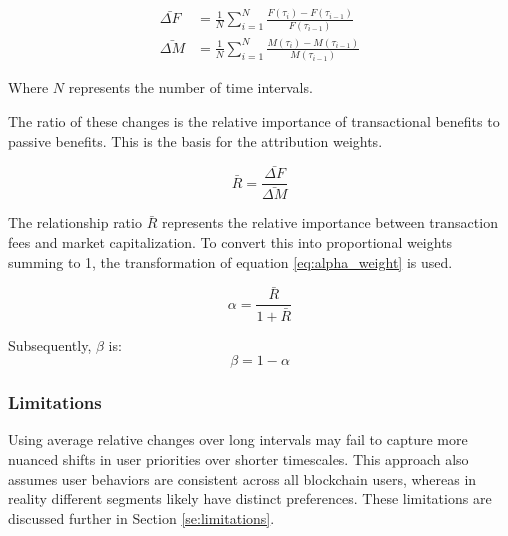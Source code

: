 \documentclass[11pt]{report}
\begin{document}
\begin{align}
    \bar{\Delta F} & = \frac{1}{N}\sum_{i=1}^{N}\frac{F(\tau_i) - F(\tau_{i-1})}{F(\tau_{i-1})} \\
    \bar{\Delta M} & = \frac{1}{N}\sum_{i=1}^{N}\frac{M(\tau_i) - M(\tau_{i-1})}{M(\tau_{i-1})}
\end{align}



Where \( N \) represents the number of time intervals.

The ratio of these changes is the relative importance of transactional benefits to passive benefits. This is the basis for the attribution weights.

\begin{equation} \label{eq:weights_ratio}
    \bar{R} = \frac{\bar{\Delta F}}{\bar{\Delta M}}
\end{equation}

The relationship ratio $\bar{R}$ represents the relative importance between transaction fees and market capitalization. To convert this into proportional weights summing to 1, the transformation of equation \eqref{eq:alpha_weight} is used.

\begin{equation} \label{eq:alpha_weight}
    \alpha = \frac{\bar{R}}{1 + \bar{R}}
\end{equation}

Subsequently, \( \beta \) is:
\begin{equation} \label{eq:beta_weight}
    \beta = 1 - \alpha
\end{equation}


\subsubsection{Limitations}
Using average relative changes over long intervals may fail to capture more nuanced shifts in user priorities over shorter timescales. This approach also assumes user behaviors are consistent across all blockchain users, whereas in reality different segments likely have distinct preferences. These limitations are discussed further in Section \ref{se:limitations}.
\end{document}

